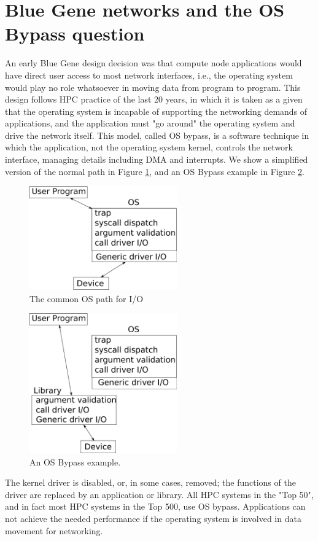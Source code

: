 \documentclass[letterpaper,twocolumn,10pt]{article}
\begin{document}
\section{Blue Gene networks and the OS Bypass question}
An early Blue Gene design decision was that  compute node applications would have direct user access to most network interfaces, i.e., the operating system would play no role whatsoever in moving data from program to program. This 
design follows HPC practice of the last 20 years, in which it is taken as a given that the operating system 
is incapable of supporting the networking demands of applications, and the application must "go around" the operating system and drive the network itself. This model, called OS bypass, is a software technique in which the application, not the operating system 
kernel, controls the network interface, managing details including DMA and interrupts. 
We show a simplified version of the normal path in Figure \ref{ospath}, and an OS Bypass example in Figure \ref{osbypass}.
\begin{figure}
\includegraphics[width=2.5in]{ospath}
\caption{\label{ospath}The common OS path for I/O}
\end{figure}
\begin{figure}
\includegraphics[width=2.5in]{osbypass}
\caption{\label{osbypass}An OS Bypass example.}
\end{figure}
The kernel driver is disabled, or, in some cases, removed; the functions of the driver are replaced by 
an application or library. 
All HPC systems in the "Top 50"\cite{top500}, and in fact most HPC systems in the Top 500, use OS bypass. Applications can not 
achieve the needed performance if the operating system is involved in data movement for networking. 
\end{document}
